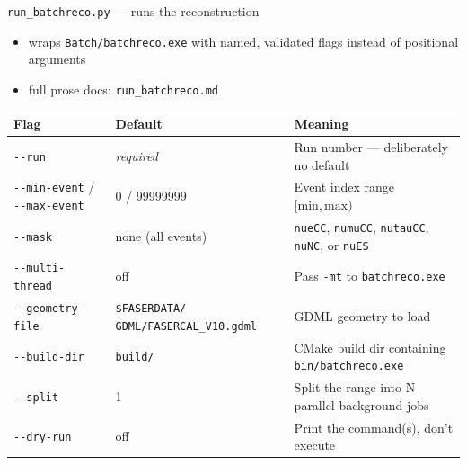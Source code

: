 \documentclass[aspectratio=169]{beamer}
\begin{document}
\begin{frame}{\texttt{run\_batchreco.py} --- runs the reconstruction}
  \begin{itemize}
    \item wraps \texttt{Batch/batchreco.exe} with named, validated flags
      instead of positional arguments
    \item full prose docs: \texttt{run\_batchreco.md}
  \end{itemize}
  \vspace{0.3cm}
  \centering
  \tiny
  \begin{tabular}{@{}p{3.1cm}p{3.0cm}p{4.9cm}@{}}
    \toprule
    \textbf{Flag} & \textbf{Default} & \textbf{Meaning} \\
    \midrule
    \texttt{-{}-run} & \emph{required} & Run number --- deliberately no
      default \\
    \texttt{-{}-min-event} / \texttt{-{}-max-event} & 0 / 99999999 & Event
      index range $[\mathrm{min},\mathrm{max})$ \\
    \texttt{-{}-mask} & none (all events) & \texttt{nueCC}, \texttt{numuCC},
      \texttt{nutauCC}, \texttt{nuNC}, or \texttt{nuES} \\
    \texttt{-{}-multi-thread} & off & Pass \texttt{-mt} to
      \texttt{batchreco.exe} \\
    \texttt{-{}-geometry-file} & \texttt{\$FASERDATA/\allowbreak
      GDML/\allowbreak FASERCAL\_V10.gdml} & GDML geometry to load \\
    \texttt{-{}-build-dir} & \texttt{build/} & CMake build dir containing
      \texttt{bin/batchreco.exe} \\
    \texttt{-{}-split} & 1 & Split the range into N parallel background jobs \\
    \texttt{-{}-dry-run} & off & Print the command(s), don't execute \\
    \bottomrule
  \end{tabular}
\end{frame}
\end{document}
